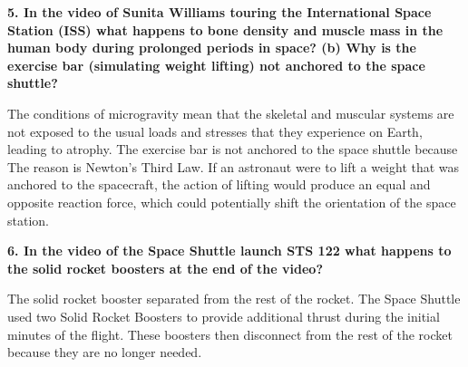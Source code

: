 \documentclass{report}
\begin{document}
    \bigbreak \noindent 
    \begin{mdframed}
        \textbf{5.  In the video of Sunita Williams touring the International Space Station (ISS) what
happens to bone density and muscle mass in the human body during prolonged periods in
space? (b) Why is the exercise bar (simulating weight lifting) not anchored to the space shuttle?}
    \end{mdframed}
    \bigbreak \noindent 
    The conditions of microgravity mean that the skeletal and muscular systems are not exposed to the usual loads and stresses that they experience on Earth, leading to atrophy. The exercise bar is not anchored to the space shuttle because The reason is Newton's Third Law. If an astronaut were to lift a weight that was anchored to the spacecraft, the action of lifting would produce an equal and opposite reaction force, which could potentially shift the orientation of the space station.

    \bigbreak \noindent 
    \begin{mdframed}
        \textbf{6. In the video of the Space Shuttle launch STS 122 what happens to the solid rocket
boosters at the end of the video?}
    \end{mdframed}
    \bigbreak \noindent 
    The solid rocket booster separated from the rest of the rocket. The Space Shuttle used two Solid Rocket Boosters to provide additional thrust during the initial minutes of the flight. These boosters then disconnect from the rest of the rocket because they are no longer needed.


    
\end{document}
